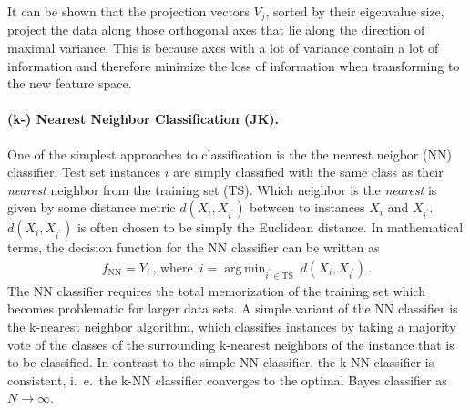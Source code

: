 \documentclass[12pt, a4paper]{scrartcl}
\DeclareMathOperator*{\argmin}{arg\,min}
\begin{document}
It can be shown that the projection vectors $V_j$, sorted by their eigenvalue size, project the data along those orthogonal axes that lie along the direction of maximal variance. This is because axes with a lot of variance contain a lot of information and therefore minimize the loss of information when transforming to the new feature space.


\paragraph{(k-) Nearest Neighbor Classification (JK).} One of the simplest approaches to classification is the the nearest neigbor (NN) classifier. Test set instances $i$ are simply classified with the same class as their \emph{nearest} neighbor from the training set (TS). 
Which neighbor is the \emph{nearest} is given by some distance metric $d(X_i, X_{i^\prime})$ between to instances $X_i$ and $X_{i^\prime}$. $d(X_i, X_{i^\prime})$ is often chosen to be simply the Euclidean distance.
In mathematical terms, the decision function for the NN classifier can be written as
\begin{align*}
	f_{\mathrm{NN}} = Y_i \, \text{,  where } \, i = \argmin_{i^\prime \in \mathrm{TS}} \: d(X_i, X_{i^\prime}) \, .
\end{align*}
The NN classifier requires the total memorization of the training set which becomes problematic for larger data sets.
A simple variant of the NN classifier is the k-nearest neighbor algorithm, which classifies instances by taking a majority vote of the classes of the surrounding k-nearest neighbors of the instance that is to be classified. In contrast to the simple NN classifier, the k-NN classifier is consistent, i.\ e.\ the k-NN classifier converges to the optimal Bayes classifier as $N\to\infty$.
\end{document}
